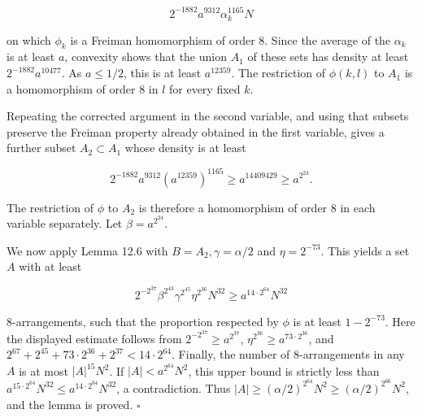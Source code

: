 \documentclass[10pt]{article}
\begin{document}
$$
2^{-1882}a^{9312}\alpha_k^{1165}N
$$

on which $\phi_k$ is a Freiman homomorphism of order 8.  Since the average
of the $\alpha_k$ is at least $a$, convexity shows that the union $A_1$ of
these sets has density at least $2^{-1882}a^{10477}$.  As $a\leqslant1/2$,
this is at least $a^{12359}$.  The restriction of $\phi(k,l)$ to $A_1$ is a
homomorphism of order 8 in $l$ for every fixed $k$.

Repeating the corrected argument in the second variable, and using that
subsets preserve the Freiman property already obtained in the first
variable, gives a further subset $A_2\subset A_1$ whose density is at least

$$
2^{-1882}a^{9312}(a^{12359})^{1165}
 \geqslant a^{14409429}\geqslant a^{2^{24}}.
$$

The restriction of $\phi$ to $A_2$ is therefore a homomorphism of order 8 in
each variable separately.  Let $\beta=a^{2^{24}}$.

We now apply Lemma 12.6 with $B=A_{2}, \gamma=\alpha / 2$ and $\eta=2^{-73}$. This yields a set $A$ with at least

$$
2^{-2^{37}} \beta^{2^{43}} \gamma^{2^{45}} \eta^{2^{36}} N^{32}
 \geqslant a^{14\cdot2^{64}}N^{32}
$$

8-arrangements, such that the proportion respected by $\phi$ is at least
$1-2^{-73}$.  Here the displayed estimate follows from
$2^{-2^{37}}\geqslant a^{2^{37}}$, $\eta^{2^{36}}\geqslant
a^{73\cdot2^{36}}$, and
$2^{67}+2^{45}+73\cdot2^{36}+2^{37}<14\cdot2^{64}$.  Finally, the number of
8-arrangements in any $A$ is at most $|A|^{15}N^2$.  If
$|A|<a^{2^{64}}N^2$, this upper bound is strictly less than
$a^{15\cdot2^{64}}N^{32}\leqslant a^{14\cdot2^{64}}N^{32}$, a contradiction.
Thus $|A|\geqslant(\alpha/2)^{2^{64}}N^2\geqslant(\alpha/2)^{2^{66}}N^2$, and the lemma is proved. \(\square\)
\end{document}
